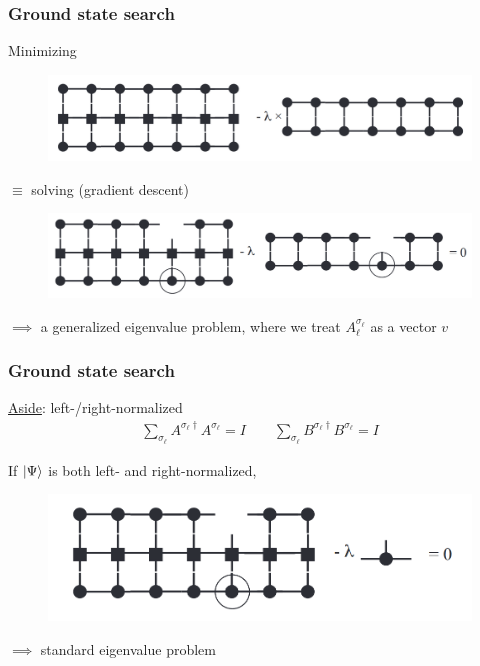 \documentclass{beamer}
\theoremstyle{definition}
\begin{document}
\begin{frame}
	\frametitle{Ground state search}
	Minimizing
	\begin{figure}[!htb]
		\centering
		\includegraphics[scale=0.25]{gnd_state_search.png}
	\end{figure}
	$\equiv$ solving (gradient descent)
	\begin{figure}[!htb]
		\centering
		\includegraphics[scale=0.25]{gnd_state_search1.png}
	\end{figure}
	$\implies$ a generalized eigenvalue problem, where we treat $A^{\sigma_\ell}_\ell$ as a vector $v$
\end{frame}

\begin{frame}
	\frametitle{Ground state search}
	
	\underline{Aside}: left-/right-normalized
	\begin{align*}
		\sum_{\sigma_\ell} A^{\sigma_\ell\dagger} A^{\sigma_\ell} = I \quad\quad \sum_{\sigma_\ell} B^{\sigma_\ell\dagger} B^{\sigma_\ell} = I
	\end{align*}
	
	If $\ket{\Psi}$ is both left- and right-normalized,
	\begin{figure}[!htb]
		\centering
		\includegraphics[scale=0.25]{gnd_state_search2.png}
\end{figure}
	$\implies$ standard eigenvalue problem 
\end{frame}
\end{document}
